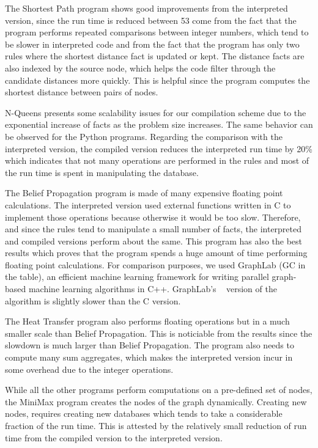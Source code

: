 The Shortest Path program shows good improvements from the interpreted version,
since the run time is reduced between 53%
come from the fact that the program performs repeated comparisons between
integer numbers, which tend to be slower in interpreted code and from the fact
that the program has only two rules where the shortest distance fact is updated
or kept.  The distance facts are also indexed by the source node, which helps
the code filter through the candidate distances more quickly. This is helpful
since the program computes the shortest distance between pairs of nodes.

N-Queens presents some scalability issues for our compilation scheme due to the
exponential increase of facts as the problem size increases.  The same behavior
can be observed for the Python programs. Regarding the comparison with the
interpreted version, the compiled version reduces the interpreted run time by
20\% which indicates that not many operations are performed in the rules and
most of the run time is spent in manipulating the database.

The Belief Propagation program is made of many expensive floating point
calculations. The interpreted version used external functions written in C to
implement those operations because otherwise it would be too slow. Therefore,
and since the rules tend to manipulate a small number of facts, the interpreted
and compiled versions perform about the same. This program has also the best
results which proves that the program spends a huge amount of time performing
floating point calculations. For comparison purposes, we used GraphLab (GC in
the table), an efficient machine learning framework for writing parallel
graph-based machine learning algorithms in C++.  GraphLab's ~\cite{GraphLab2010}
version of the algorithm is slightly slower than the C version.

The Heat Transfer program also performs floating operations but in a much
smaller scale than Belief Propagation. This is noticiable from the results since
the slowdown is much larger than Belief Propagation. The program also needs to
compute many sum aggregates, which makes the interpreted version incur in some
overhead due to the integer operations.

While all the other programs perform computations on a pre-defined set of nodes,
the MiniMax program creates the nodes of the graph dynamically.  Creating new
nodes, requires creating new databases which tends to take a considerable
fraction of the run time. This is attested by the relatively small reduction of
run time from the compiled version to the interpreted version.

